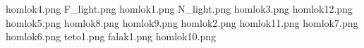 homlok4.png
F_light.png
homlok1.png
N_light.png
homlok3.png
homlok12.png
homlok5.png
homlok8.png
homlok9.png
homlok2.png
homlok11.png
homlok7.png
homlok6.png
teto1.png
falak1.png
homlok10.png
